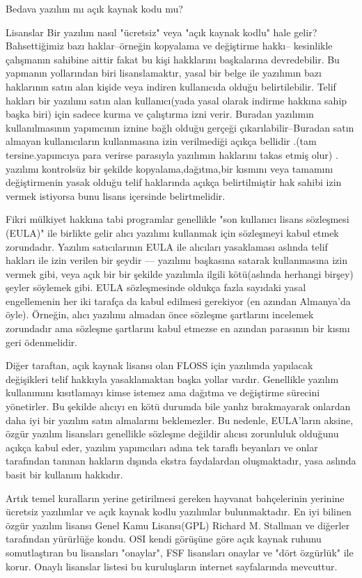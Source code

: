 \documentclass[10pt,a5paper]{book}
\begin{document}
\begin{section}{Bedava yazılım mı açık kaynak kodu mu?}
\begin{subsection}{Lisanslar}
Bir yazılım nasıl  "ücretsiz" veya "açık kaynak kodlu" hale gelir?  Bahsettiğimiz bazı haklar--örneğin kopyalama ve değiştirme hakkı-- kesinlikle çalışmanın sahibine aittir fakat bu kişi hakklarını başkalarına devredebilir. Bu yapmanın  yollarından biri lisanslamaktır, yasal bir belge ile yazılımın bazı haklarının satın alan kişide veya indiren kullanıcıda olduğu belirtilebilir. Telif hakları bir yazılımı satın alan kullanıcı(yada yasal olarak indirme hakkına sahip başka biri) için sadece kurma ve çalıştırma izni verir. Buradan yazılımın kullanılmasının yapımcının iznine bağlı olduğu gerçeği çıkarılabilir--Buradan satın almayan kullanıcıların kullanmasına izin verilmediği açıkça bellidir .(tam tersine.yapımcıya para verirse parasıyla yazılımın haklarını takas etmiş olur) . yazılımı kontrolsüz bir şekilde  kopyalama,dağıtma,bir kısmını veya tamamını değiştirmenin yasak olduğu telif haklarında açıkça belirtilmiştir hak sahibi izin vermek istiyorsa bunu lisans içersinde belirtmelidir.

Fikri mülkiyet hakkına tabi programlar genellikle "son kullanıcı lisans sözleşmesi (EULA)" ile birlikte gelir alıcı yazılımı kullanmak için  sözleşmeyi kabul etmek zorundadır. Yazılım satıcılarının EULA ile  alıcıları yasaklaması aslında telif hakları ile izin verilen bir şeydir ---
yazılımı başkasına  satarak kullanmasına izin vermek gibi, veya açık bir bir şekilde yazılımla ilgili kötü(aslında herhangi birşey) şeyler söylemek gibi.
EULA  sözleşmesinde oldukça fazla sayıdaki yasal engellemenin her iki tarafça da kabul edilmesi gerekiyor (en azından Almanya'da öyle). Örneğin, alıcı yazılımı almadan önce sözleşme şartlarını incelemek zorundadır ama sözleşme şartlarını kabul etmezse en azından parasının bir kısmı geri ödenmelidir.

Diğer taraftan, açık kaynak lisansı olan FLOSS için yazılımda yapılacak değişikleri telif hakkıyla yasaklamaktan başka yollar vardır. Genellikle yazılım kullanımını kısıtlamayı kimse istemez ama dağıtma ve değiştirme sürecini yönetirler. Bu şekilde alıcıyı en kötü durumda bile yanlız bırakmayarak onlardan daha iyi bir yazılım satın almalarını beklemezler. Bu nedenle, EULA'ların aksine, özgür yazılım lisansları genellikle sözleşme değildir alıcısı zorunluluk olduğunu açıkça kabul eder, yazılım yapımcıları adına tek taraflı beyanları ve onlar tarafından tanınan hakların dışında ekstra faydalardan oluşmaktadır, yasa aslında basit bir kullanım hakkıdır.

Artık temel kuralların yerine getirilmesi gereken hayvanat bahçelerinin yerinine ücretsiz yazılımlar ve  açık kaynak kodlu yazılımlar bulunmaktadır. En iyi bilinen özgür yazılım lisansı Genel Kamu Lisansı(GPL)  Richard M. Stallman ve diğerler tarafından yürürlüğe kondu. OSI kendi görüşüne göre açık kaynak ruhunu somutlaştıran bu lisansları "onaylar", FSF  lisansları onaylar ve "dört özgürlük" ile korur. Onaylı lisanslar listesi bu kuruluşların internet sayfalarında mevcuttur.


\end{subsection}
\end{section}
\end{document}
